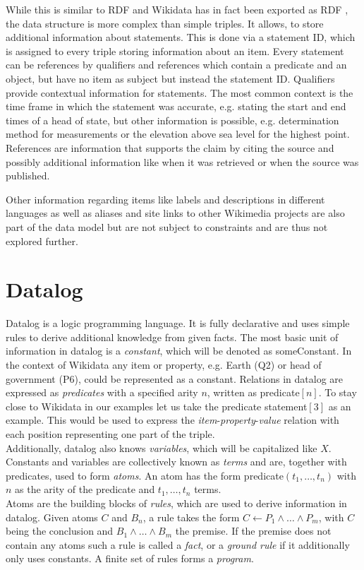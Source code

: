 \documentclass[hyperref,bachelorofscience,fleqn]{cgvpub}
\begin{document}
While this is similar to RDF and Wikidata has in fact been exported as RDF \cite{EGKMV2014}, the data structure is more complex than simple triples. It allows, to store additional information about statements. This is done via a statement ID, which is assigned to every triple storing information about an item. Every statement can be references by qualifiers and references which contain a predicate and an object, but have no item as subject but instead the statement ID. Qualifiers provide contextual information for statements. The most common context is the time frame in which the statement was accurate, e.g. stating the start and end times of a head of state, but other information is possible, e.g. determination method for measurements or the elevation above sea level for the highest point. References are information that supports the claim by citing the source and possibly additional information like when it was retrieved or when the source was published.

Other information regarding items like labels and descriptions in different languages as well as aliases and site links to other Wikimedia projects are also part of the data model but are not subject to constraints and are thus not explored further.
\section{Datalog}
Datalog is a logic programming language. It is fully declarative and uses simple rules to derive additional knowledge from given facts. The most basic unit of information in datalog is a \emph{constant}, which will be denoted as someConstant. In the context of Wikidata any item or property, e.g. Earth (Q2) or head of government (P6), could be represented as a constant. Relations in datalog are expressed as \emph{predicates} with a specified arity \(n\), written as predicate\([n]\). To stay close to Wikidata in our examples let us take the predicate statement\([3]\) as an example. This would be used to express the \emph{item}-\emph{property}-\emph{value} relation with each position representing one part of the triple.\\
Additionally, datalog also knows \emph{variables}, which will be capitalized like \(X\). Constants and variables are collectively known as \emph{terms} and are, together with predicates, used to form \emph{atoms}. An atom has the form predicate\((t_1, \ldots , t_n)\) with \(n\) as the arity of the predicate and \(t_1,\ldots,t_n\) terms.\\
Atoms are the building blocks of \emph{rules}, which are used to derive information in datalog. Given atoms \(C\) and \(B_n\), a rule takes the form \(C \leftarrow P_1 \wedge \ldots \wedge P_m\), with \(C\) being the conclusion and \(B_1 \wedge \ldots \wedge B_m\) the premise. If the premise does not contain any atoms such a rule is called a \emph{fact}, or a \emph{ground rule} if it additionally only uses constants. A finite set of rules forms a \emph{program}.\\
\end{document}
